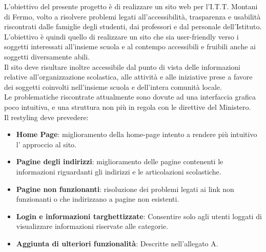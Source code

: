 \documentclass{article}
\begin{document}
	\begin{flushleft}
		
		L'obiettivo del presente progetto è di realizzare un sito web per l'I.T.T. Montani di Fermo, volto a risolvere problemi legati all'accessibilità, trasparenza e usabilità riscontrati dalle famiglie degli studenti, dai professori e dal personale dell'Istituto. \\
		L'obiettivo è quindi quello di realizzare un sito che sia user-friendly verso i soggetti interessati all'insieme scuola e al contempo accessibili e fruibili anche ai soggetti diversamente abili.\\
		Il sito deve risultare inoltre accessibile dal punto di vista delle informazioni relative all'organizzazione scolastica, alle attività e alle iniziative prese a favore dei soggetti coinvolti nell'insieme scuola e dell'intera comunità locale.\\
		Le problematiche riscontrate attualmente sono dovute ad una interfaccia grafica poco intuitiva, e una struttura non più in regola con le direttive del Ministero.   \\
		
		Il restyling deve prevedere:
		
		\begin{itemize}
			
			\item \textbf{Home Page}: miglioramento della home-page intento a rendere più intuitivo l' approccio al sito. 
			
			\item \textbf{Pagine degli indirizzi}: miglioramento delle pagine contenenti le informazioni riguardanti gli indirizzi e le articolazioni scolastiche.
			
			\item \textbf{Pagine non funzionanti}: risoluzione dei problemi legati ai link non funzionanti o che indirizzano a pagine non esistenti.
			
			\item \textbf{Login e informazioni targhettizzate}: Consentire solo agli utenti loggati di visualizzare informazioni riservate alle categorie.
			
			\item \textbf{Aggiunta di ulteriori funzionalità}: Descritte nell'allegato A.
			
			
			
		\end{itemize}
		
		\vspace{2mm}
		

\end{flushleft}
\end{document}
